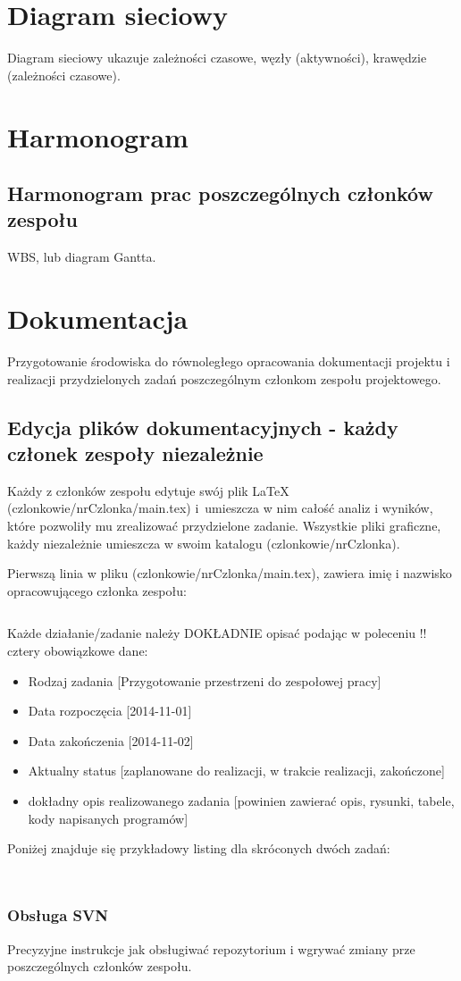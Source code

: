 \section{Diagram sieciowy}
Diagram sieciowy ukazuje zależności czasowe, węzły (aktywności), krawędzie (zależności czasowe).


\section{Harmonogram}
\subsection{Harmonogram prac poszczególnych członków zespołu}
WBS, lub diagram Gantta.


\section{Dokumentacja}
Przygotowanie środowiska do równoległego opracowania dokumentacji projektu i realizacji przydzielonych zadań poszczególnym członkom zespołu projektowego.

\subsection[Edycja plików dokumentacyjnych]{Edycja plików dokumentacyjnych - każdy członek zespoły niezależnie}
Każdy z członków zespołu edytuje swój plik \LaTeX{} (czlonkowie/nrCzlonka/main.tex) i~umieszcza w nim całość analiz i wyników, które pozwoliły mu zrealizować przydzielone zadanie. Wszystkie pliki graficzne, każdy niezależnie umieszcza w swoim katalogu (czlonkowie/nrCzlonka).

Pierwszą linia w pliku (czlonkowie/nrCzlonka/main.tex), zawiera imię i nazwisko opracowującego członka zespołu:
\begin{lstlisting}
\end{lstlisting}

Każde działanie/zadanie należy DOKŁADNIE opisać podając w poleceniu \s!\zadanieprojektowe! cztery obowiązkowe dane:
\begin{itemize}
\item Rodzaj zadania [Przygotowanie przestrzeni do zespołowej pracy]
\item Data rozpoczęcia [2014-11-01]
\item Data zakończenia [2014-11-02]
\item Aktualny status [zaplanowane do realizacji, w trakcie realizacji, zakończone]
\item dokładny opis realizowanego zadania [powinien zawierać opis, rysunki, tabele, kody napisanych programów]
\end{itemize}

Poniżej znajduje się przykładowy listing dla skróconych dwóch zadań:
\begin{lstlisting}


\end{lstlisting}


\subsubsection{Obsługa SVN}
Precyzyjne instrukcje jak obsługiwać repozytorium i wgrywać zmiany prze poszczególnych członków zespołu.

